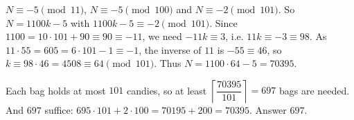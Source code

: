 $N\equiv-5\pmod{11}$, $N\equiv-5\pmod{100}$ and $N\equiv-2\pmod{101}$. So $N=1100k-5$ with $1100k-5\equiv-2\pmod{101}$. Since $1100=10\cdot101+90\equiv90\equiv-11$, we need $-11k\equiv3$, i.e. $11k\equiv-3\equiv98$. As $11\cdot55=605=6\cdot101-1\equiv-1$, the inverse of $11$ is $-55\equiv46$, so $k\equiv98\cdot46=4508\equiv64\pmod{101}$. Thus $N=1100\cdot64-5=70395$.

Each bag holds at most $101$ candies, so at least $\left\lceil\dfrac{70395}{101}\right\rceil=697$ bags are needed. And $697$ suffice: $695\cdot101+2\cdot100=70195+200=70395$. Answer $\boxed{697}$.

